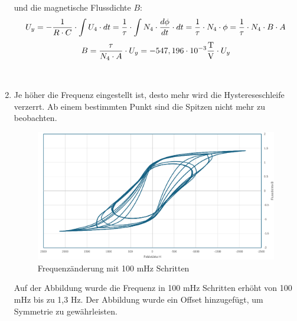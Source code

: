 \documentclass[a4paper,twoside,12pt,DIV=13,BCOR=5mm,numbers=noenddot,cleardoublepage=empty]{scrbook}
\begin{document}
\begin{enumerate}
                und die magnetische Flussdichte $B$:
                \begin{equation}
                    U_y = -\frac{1}{R \cdot C} \cdot \int U_4 \cdot dt \\
                    = \frac{1}{\tau} \cdot \int N_4 \cdot \frac{d\phi}{dt} \cdot dt \\
                    = \frac{1}{\tau} \cdot N_4 \cdot \phi \\
                    = \frac{1}{\tau} \cdot N_4 \cdot B \cdot A \\
                \end{equation}
                \begin{equation}
                    B = \frac{\tau}{N_4 \cdot A} \cdot U_y \\
                    = -547,196 \cdot 10^{-3} \frac{\text{T}}{\text{V}} \cdot U_y
                \end{equation}

            \\

            \newpage

            \item Je höher die Frequenz eingestellt ist, desto mehr wird die Hystereseschleife verzerrt. Ab einem bestimmten Punkt sind die Spitzen nicht mehr zu beobachten.

            \begin{figure}[h] 
            \centering
            \includegraphics[width=\textwidth]{pictures/freqAnderung.png} 
            \caption{Frequenzänderung mit 100 mHz Schritten}
            \label{fig:meinbild}
            \end{figure}

            Auf der Abbildung wurde die Frequenz in 100 mHz Schritten erhöht von 100 mHz bis zu 1,3 Hz.
            Der Abbildung wurde ein Offset hinzugefügt, um Symmetrie zu gewährleisten.
            \\


\end{enumerate}
\end{document}
